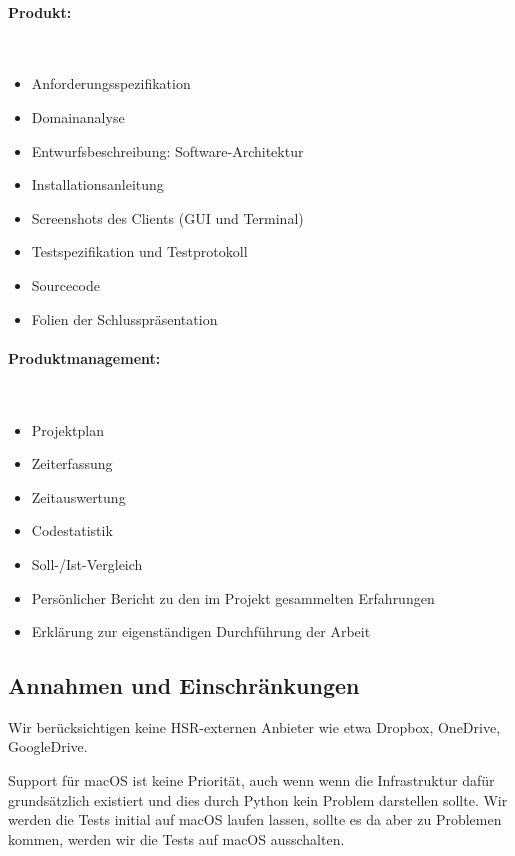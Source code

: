 \documentclass[a4paper]{article}
\begin{document}
\begin{multicols}{2}
  \paragraph{Produkt:} \strut \\[-1em]
  \begin{itemize}
    \item Anforderungsspezifikation
    \item Domainanalyse
    \item Entwurfsbeschreibung: Software-Architektur
    \item Installationsanleitung
    \item Screenshots des Clients (GUI und Terminal)
    \item Testspezifikation und Testprotokoll
    \item Sourcecode
    \item Folien der Schlusspräsentation
  \end{itemize}

  \paragraph{Produktmanagement:} \strut \\[-1em]
  \begin{itemize}
    \item Projektplan
    \item Zeiterfassung
    \item Zeitauswertung
    \item Codestatistik
    \item Soll-/Ist-Vergleich
    \item Persönlicher Bericht zu den im Projekt gesammelten Erfahrungen
    \item Erklärung zur eigenständigen Durchführung der Arbeit
  \end{itemize}
\end{multicols}

\subsection{Annahmen und Einschränkungen}
Wir berücksichtigen keine HSR-externen Anbieter wie etwa Dropbox, OneDrive, GoogleDrive.

Support für macOS ist keine Priorität, auch wenn wenn die Infrastruktur dafür grundsätzlich existiert und dies durch Python kein Problem darstellen sollte. Wir werden die Tests initial auf macOS laufen lassen, sollte es da aber zu Problemen kommen, werden wir die Tests auf macOS ausschalten.
\end{document}
